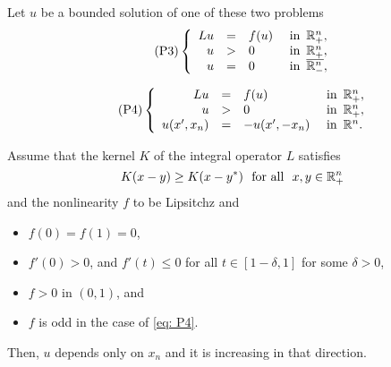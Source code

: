 \begin{theorem}
\label{Thm: SymmHalfSpace}
Let $u$ be a bounded solution of one of these two problems
\begin{equation}
\leqnomode
\tag{P3}
\label{eq: P3}
\beqc{\PDEsystem}
Lu &=& f(u)   &\textrm{ in } \,\R^n_+,\\
u &>& 0   &\textrm{ in } \,\R^n_+,\\
u &=& 0   &\textrm{ in } \,\overline{\R^n_-},
\eeqc
\end{equation}

\begin{equation}
\leqnomode
\tag{P4}
\label{eq: P4}
\beqc{\PDEsystem}
Lu &=& f(u)   &\textrm{ in } \,\R^n_+,\\
u &>& 0   &\textrm{ in } \,\R^n_+,\\
u(x',x_n) &=& -u(x',-x_n)   &\textrm{ in } \,\R^n.
\eeqc
\end{equation}

\reqnomode

Assume that the kernel $K$ of the integral operator $L$ satisfies
$$ K(x-y) \geq K(x-y^*) \,\,\,\,\text{for all } \,\, x,y\in \mathbb{R}^n_+  $$
and the nonlinearity $f$ to be Lipsitchz and
\begin{itemize}
\item $f(0) = f(1) = 0$,
\item $f'(0)>0$, and $f'(t)\leq 0$ for all $t\in[1-\delta,1]$ for some $\delta>0$,
\item $f>0$ in $(0,1)$, and
\item $f$ is odd in the case of \eqref{eq: P4}.
\end{itemize}
Then, $u$ depends only on $x_n$ and it is increasing in that direction.
\end{theorem}

